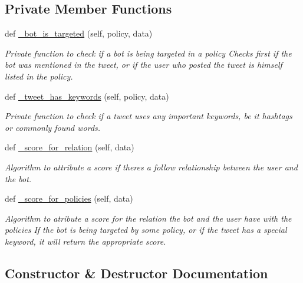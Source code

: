 \subsection*{Private Member Functions}
\begin{DoxyCompactItemize}
\item 
def \hyperlink{classtwitter_1_1control__center_1_1PDP_1_1PDP_a302067b5d102cbe2a5f55355bb204333}{\+\_\+bot\+\_\+is\+\_\+targeted} (self, policy, data)
\begin{DoxyCompactList}\small\item\em Private function to check if a bot is being targeted in a policy Checks first if the bot was mentioned in the tweet, or if the user who posted the tweet is himself listed in the policy. \end{DoxyCompactList}\item 
def \hyperlink{classtwitter_1_1control__center_1_1PDP_1_1PDP_a66187cf251e70e9f579406e45eb16137}{\+\_\+tweet\+\_\+has\+\_\+keywords} (self, policy, data)
\begin{DoxyCompactList}\small\item\em Private function to check if a tweet uses any important keywords, be it hashtags or commonly found words. \end{DoxyCompactList}\item 
def \hyperlink{classtwitter_1_1control__center_1_1PDP_1_1PDP_ab958d1ecb98242eace6e2b55f61fefa2}{\+\_\+score\+\_\+for\+\_\+relation} (self, data)
\begin{DoxyCompactList}\small\item\em Algorithm to attribute a score if there\textquotesingle{}s a follow relationship between the user and the bot. \end{DoxyCompactList}\item 
def \hyperlink{classtwitter_1_1control__center_1_1PDP_1_1PDP_ab3d879dc9a07fad8632ec8db1ecc93c8}{\+\_\+score\+\_\+for\+\_\+policies} (self, data)
\begin{DoxyCompactList}\small\item\em Algorithm to atribute a score for the relation the bot and the user have with the policies If the bot is being targeted by some policy, or if the tweet has a special keyword, it will return the appropriate score. \end{DoxyCompactList}\end{DoxyCompactItemize}


\subsection{Constructor \& Destructor Documentation}
\mbox{\label{classtwitter_1_1control__center_1_1PDP_1_1PDP_adf406e4b2ad47c65c563ccc7eccaf871}} 
